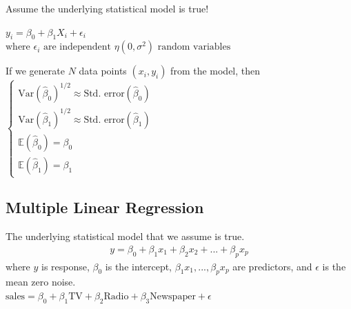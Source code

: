 \documentclass[12pt, letterpaper]{article}
\begin{document}
\noindent Assume the underlying statistical model is true! 
\begin{center}
    $y_i = \beta_0 + \beta_1X_i + \epsilon_i$ \\
    $\text{where } \epsilon_i \text{ are independent }\eta(0,\sigma^2) \text{ random variables}$
\end{center}
If we generate $N$ data points $(x_i, y_i)$ from the model, then \\
$\begin{cases}
    \text{Var}(\hat \beta_0)^{1/2} \approx \hat{\text{Std. error}} (\hat \beta_0) \\ 
    \text{Var}(\hat \beta_1)^{1/2} \approx \hat{\text{Std. error}} (\hat \beta_1) \\ 
    \mathbb{E}(\hat \beta_0) = \beta_0 \\
    \mathbb{E}(\hat \beta_1) = \beta_1
\end{cases}$

\subsection{Multiple Linear Regression}
The underlying statistical model that we assume is true.
\begin{align*}
    y = \beta_0 + \beta_1x_1 + \beta_2x_2 + ... + \beta_px_p
\end{align*}
where $y$ is response, $\beta_0$ is the intercept, $\beta_1x_1,...,\beta_px_p$ are predictors, and $\epsilon$ is the mean zero noise. \\

\noindent {} \quad $\text{sales} = \beta_0 + \beta_1 \text{TV} + \beta_2 \text{Radio} + \beta_3 \text{Newspaper} + \epsilon$
\end{document}
